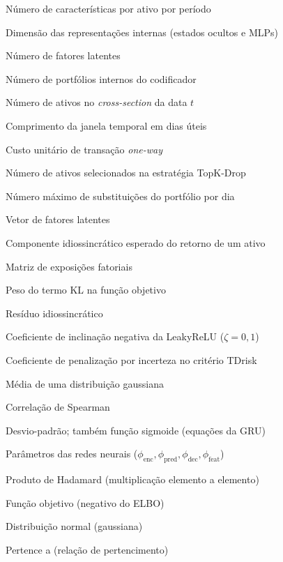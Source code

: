 \begin{simbolos} \itemsep -1pt
  \item[$ C $]                Número de características por ativo por período
  \item[$ H $]                Dimensão das representações internas (estados ocultos e MLPs)
  \item[$ K $]                Número de fatores latentes
  \item[$ M $]                Número de portfólios internos do codificador
  \item[$ N_t $]              Número de ativos no \textit{cross-section} da data $t$
  \item[$ T $]                Comprimento da janela temporal em dias úteis
  \item[$ c $]                Custo unitário de transação \textit{one-way}
  \item[$ k $]                Número de ativos selecionados na estratégia TopK-Drop
  \item[$ n $]                Número máximo de substituições do portfólio por dia
  \item[$ z $]                Vetor de fatores latentes
  \item[$ \alpha $]           Componente idiossincrático esperado do retorno de um ativo
  \item[$ \beta $]            Matriz de exposições fatoriais
  \item[$ \gamma $]           Peso do termo KL na função objetivo
  \item[$ \varepsilon $]      Resíduo idiossincrático
  \item[$ \zeta $]            Coeficiente de inclinação negativa da LeakyReLU ($\zeta = 0{,}1$)
  \item[$ \eta $]             Coeficiente de penalização por incerteza no critério TDrisk
  \item[$ \mu $]              Média de uma distribuição gaussiana
  \item[$ \rho $]             Correlação de Spearman
  \item[$ \sigma $]           Desvio-padrão; também função sigmoide (equações da GRU)
  \item[$ \phi $]             Parâmetros das redes neurais ($\phi_{\text{enc}}, \phi_{\text{pred}}, \phi_{\text{dec}}, \phi_{\text{feat}}$)
  \item[$ \odot $]            Produto de Hadamard (multiplicação elemento a elemento)
  \item[$ \mathcal{L} $]      Função objetivo (negativo do ELBO)
  \item[$ \mathcal{N} $]      Distribuição normal (gaussiana)
  \item[$ \in $]              Pertence a (relação de pertencimento)
\end{simbolos}